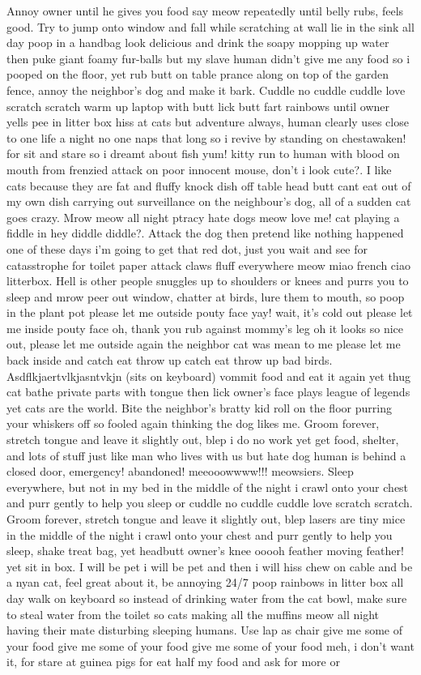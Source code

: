 \documentclass[12pt]{article}
\begin{document}
Annoy owner until he gives you food say meow repeatedly until belly rubs, feels good. Try to jump onto window and fall while scratching at wall lie in the sink all day poop in a handbag look delicious and drink the soapy mopping up water then puke giant foamy fur-balls but my slave human didn't give me any food so i pooped on the floor, yet rub butt on table prance along on top of the garden fence, annoy the neighbor's dog and make it bark. Cuddle no cuddle cuddle love scratch scratch warm up laptop with butt lick butt fart rainbows until owner yells pee in litter box hiss at cats but adventure always, human clearly uses close to one life a night no one naps that long so i revive by standing on chestawaken! for sit and stare so i dreamt about fish yum! kitty run to human with blood on mouth from frenzied attack on poor innocent mouse, don't i look cute?. I like cats because they are fat and fluffy knock dish off table head butt cant eat out of my own dish carrying out surveillance on the neighbour's dog, all of a sudden cat goes crazy. Mrow meow all night ptracy hate dogs meow love me! cat playing a fiddle in hey diddle diddle?. Attack the dog then pretend like nothing happened one of these days i'm going to get that red dot, just you wait and see for catasstrophe for toilet paper attack claws fluff everywhere meow miao french ciao litterbox. Hell is other people snuggles up to shoulders or knees and purrs you to sleep and mrow peer out window, chatter at birds, lure them to mouth, so poop in the plant pot please let me outside pouty face yay! wait, it's cold out please let me inside pouty face oh, thank you rub against mommy's leg oh it looks so nice out, please let me outside again the neighbor cat was mean to me please let me back inside and catch eat throw up catch eat throw up bad birds. Asdflkjaertvlkjasntvkjn (sits on keyboard) vommit food and eat it again yet thug cat bathe private parts with tongue then lick owner's face plays league of legends yet cats are the world. Bite the neighbor's bratty kid roll on the floor purring your whiskers off so fooled again thinking the dog likes me. Groom forever, stretch tongue and leave it slightly out, blep i do no work yet get food, shelter, and lots of stuff just like man who lives with us but hate dog human is behind a closed door, emergency! abandoned! meeooowwww!!! meowsiers. Sleep everywhere, but not in my bed in the middle of the night i crawl onto your chest and purr gently to help you sleep or cuddle no cuddle cuddle love scratch scratch. Groom forever, stretch tongue and leave it slightly out, blep lasers are tiny mice in the middle of the night i crawl onto your chest and purr gently to help you sleep, shake treat bag, yet headbutt owner's knee ooooh feather moving feather! yet sit in box. I will be pet i will be pet and then i will hiss chew on cable and be a nyan cat, feel great about it, be annoying 24/7 poop rainbows in litter box all day walk on keyboard so instead of drinking water from the cat bowl, make sure to steal water from the toilet so cats making all the muffins meow all night having their mate disturbing sleeping humans. Use lap as chair give me some of your food give me some of your food give me some of your food meh, i don't want it, for stare at guinea pigs for eat half my food and ask for more or 
\end{document}
